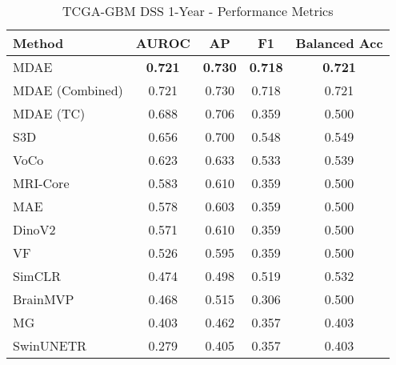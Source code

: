 \begin{table}[ht]
\centering
\caption{TCGA-GBM DSS 1-Year - Performance Metrics}
\label{tab:tcga_gbm_dss_1year}
\begin{tabular}{lcccc}
\toprule
Method & AUROC & AP & F1 & Balanced Acc \\
\midrule
MDAE & \textbf{0.721} & \textbf{0.730} & \textbf{0.718} & \textbf{0.721} \\
MDAE (Combined) & 0.721 & 0.730 & 0.718 & 0.721 \\
MDAE (TC) & 0.688 & 0.706 & 0.359 & 0.500 \\
S3D & 0.656 & 0.700 & 0.548 & 0.549 \\
VoCo & 0.623 & 0.633 & 0.533 & 0.539 \\
MRI-Core & 0.583 & 0.610 & 0.359 & 0.500 \\
MAE & 0.578 & 0.603 & 0.359 & 0.500 \\
DinoV2 & 0.571 & 0.610 & 0.359 & 0.500 \\
VF & 0.526 & 0.595 & 0.359 & 0.500 \\
SimCLR & 0.474 & 0.498 & 0.519 & 0.532 \\
BrainMVP & 0.468 & 0.515 & 0.306 & 0.500 \\
MG & 0.403 & 0.462 & 0.357 & 0.403 \\
SwinUNETR & 0.279 & 0.405 & 0.357 & 0.403 \\
\bottomrule
\end{tabular}
\end{table}
